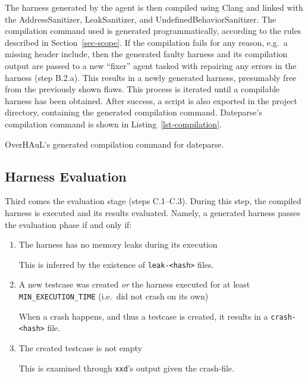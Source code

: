 \documentclass[
  a4paper,
]{scrreprt}
\newenvironment{Shaded}{\begin{snugshade}}{\end{snugshade}}
\newcommand{\AttributeTok}[1]{\textcolor[rgb]{0.65,0.35,0.00}{#1}}
\newcommand{\CommentTok}[1]{\textcolor[rgb]{0.41,0.41,0.41}{#1}}
\newcommand{\ExtensionTok}[1]{\textcolor[rgb]{0.33,0.33,0.33}{#1}}
\newcommand{\FunctionTok}[1]{\textcolor[rgb]{0.02,0.16,0.49}{#1}}
\newcommand{\NormalTok}[1]{\textcolor[rgb]{0.33,0.33,0.33}{#1}}
\newcommand{\OperatorTok}[1]{\textcolor[rgb]{0.00,0.46,0.62}{#1}}
\theoremstyle{definition}
\theoremstyle{remark}
\begin{document}
The harness generated by the agent is then compiled using Clang and
linked with the AddressSanitizer, LeakSanitizer, and
UndefinedBehaviorSanitizer. The compilation command used is generated
programmatically, according to the rules described in
Section~\ref{sec-scope}. If the compilation fails for any reason, e.g.~a
missing header include, then the generated faulty harness and its
compilation output are passed to a new ``fixer'' agent tasked with
repairing any errors in the harness (step B.2.a). This results in a
newly generated harness, presumably free from the previously shown
flaws. This process is iterated until a compilable harness has been
obtained. After success, a script is also exported in the project
directory, containing the generated compilation command. Dateparse's
compilation command is shown in Listing~\ref{lst-compilation}.

\begin{codelisting}

\caption[Generated compilation
command]{\label{lst-compilation}OverHAuL's generated compilation command
for dateparse.}

\centering{

\begin{Shaded}
\begin{Highlighting}[numbers=left,,]
\CommentTok{\# cat ./overhaul.sh}
\FunctionTok{clang} \AttributeTok{{-}g} \AttributeTok{{-}fsanitize}\OperatorTok{=}\NormalTok{fuzzer,address,undefined harnesses/harness.c }\AttributeTok{{-}I}\NormalTok{ . }
 \ExtensionTok{dateparse.c} \AttributeTok{{-}o}\NormalTok{ harness}
\end{Highlighting}
\end{Shaded}

}

\end{codelisting}%

\subsection{Harness Evaluation}\label{sec-evaluation}

Third comes the evaluation stage (steps C.1--C.3). During this step, the
compiled harness is executed and its results evaluated. Namely, a
generated harness passes the evaluation phase if and only if:

\begin{enumerate}
\def\labelenumi{\arabic{enumi}.}
\item
  The harness has no memory leaks during its execution

  This is inferred by the existence of
  \texttt{leak-\textless{}hash\textgreater{}} files.
\item
  A new testcase was created \emph{or} the harness executed for at least
  \texttt{MIN\_EXECUTION\_TIME} (i.e.~did not crash on its own)

  When a crash happens, and thus a testcase is created, it results in a
  \texttt{crash-\textless{}hash\textgreater{}} file.
\item
  The created testcase is not empty

  This is examined through \texttt{xxd}'s output given the crash-file.
\end{enumerate}
\end{document}
